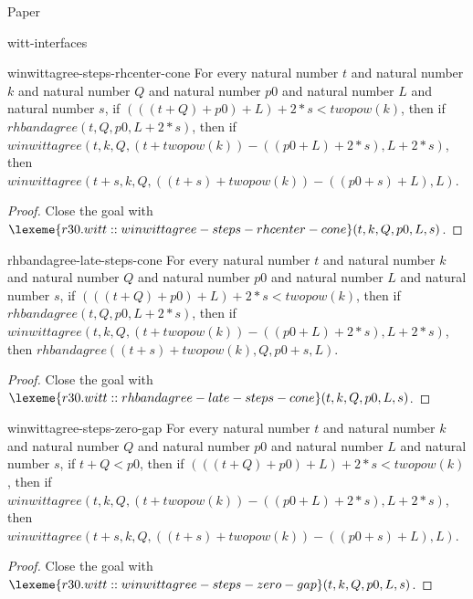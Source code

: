 \begin{lexlean}{Paper}
\begin{section}{witt-interfaces}
  \begin{theorem}{winwittagree-steps-rhcenter-cone}
  For every natural number \(t\) and natural number \(k\) and natural number \(Q\) and natural number \(p0\) and natural number \(L\) and natural number \(s\), if \((((t + Q) + p0) + L) + 2 * s < twopow(k)\), then if \(rhbandagree(t, Q, p0, L + 2 * s)\), then if \(winwittagree(t, k, Q, (t + twopow(k)) - ((p0 + L) + 2 * s), L + 2 * s)\), then \(winwittagree(t + s, k, Q, ((t + s) + twopow(k)) - ((p0 + s) + L), L)\).
  \begin{proof}
  Close the goal with \(\lexeme{r30.witt::winwittagree-steps-rhcenter-cone}(t, k, Q, p0, L, s)\).
  \end{proof}
  \end{theorem}

  \begin{theorem}{rhbandagree-late-steps-cone}
  For every natural number \(t\) and natural number \(k\) and natural number \(Q\) and natural number \(p0\) and natural number \(L\) and natural number \(s\), if \((((t + Q) + p0) + L) + 2 * s < twopow(k)\), then if \(rhbandagree(t, Q, p0, L + 2 * s)\), then if \(winwittagree(t, k, Q, (t + twopow(k)) - ((p0 + L) + 2 * s), L + 2 * s)\), then \(rhbandagree((t + s) + twopow(k), Q, p0 + s, L)\).
  \begin{proof}
  Close the goal with \(\lexeme{r30.witt::rhbandagree-late-steps-cone}(t, k, Q, p0, L, s)\).
  \end{proof}
  \end{theorem}

  \begin{theorem}{winwittagree-steps-zero-gap}
  For every natural number \(t\) and natural number \(k\) and natural number \(Q\) and natural number \(p0\) and natural number \(L\) and natural number \(s\), if \(t + Q < p0\), then if \((((t + Q) + p0) + L) + 2 * s < twopow(k)\), then if \(winwittagree(t, k, Q, (t + twopow(k)) - ((p0 + L) + 2 * s), L + 2 * s)\), then \(winwittagree(t + s, k, Q, ((t + s) + twopow(k)) - ((p0 + s) + L), L)\).
  \begin{proof}
  Close the goal with \(\lexeme{r30.witt::winwittagree-steps-zero-gap}(t, k, Q, p0, L, s)\).
  \end{proof}
  \end{theorem}


\end{section}
\end{lexlean}
